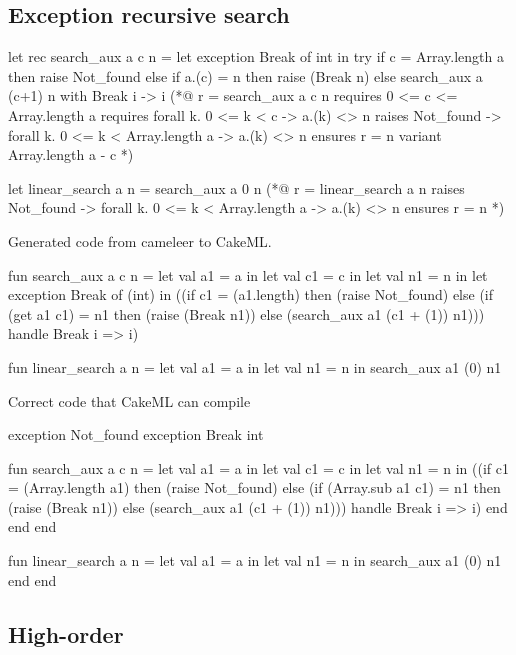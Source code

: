 \subsection{Exception recursive search}

\begin{gospell}
let rec search_aux a c n =
    let exception Break of int in try
        if c = Array.length a then raise Not_found else if a.(c) = n 
        then raise (Break n) else search_aux a (c+1) n
    with Break i -> i
(*@
    r = search_aux a c n
    requires 0 <= c <= Array.length a
    requires forall k. 0 <= k < c -> a.(k) <> n
    raises Not_found -> forall k. 0 <= k < Array.length a -> a.(k) <> n
    ensures r = n
    variant Array.length a - c
*)

let linear_search a n = search_aux a 0 n
(*@
    r = linear_search a n
    raises Not_found -> forall k. 0 <= k < Array.length a -> a.(k) <> n
    ensures r = n
*)
\end{gospell}

Generated code from cameleer to CakeML.

\begin{cakeml}
fun search_aux a c n = let val a1 = a in
  let val c1 = c in
  let val n1 = n in
  let exception Break of (int) in
  ((if c1 = (a1.length) then (raise Not_found) 
    else (if (get a1 c1) = n1 then (raise (Break n1)) 
          else (search_aux a1 (c1 + (1)) n1)))
  handle   Break i => i)

fun linear_search a n =
  let val a1 = a in let val n1 = n in search_aux a1 (0) n1
\end{cakeml}

Correct code that CakeML can compile

\begin{cakeml}

exception Not_found
exception Break int

fun search_aux a c n = let val a1 = a in
  let val c1 = c in
  let val n1 = n in
  ((if c1 = (Array.length a1) then (raise Not_found) 
    else (if (Array.sub  a1 c1) = n1 then (raise (Break n1)) 
          else (search_aux a1 (c1 + (1)) n1)))
  handle Break i => i)
  end end end

fun linear_search a n =
  let val a1 = a in let val n1 = n in search_aux a1 (0) n1 
  end end

\end{cakeml}

\subsection{High-order}

